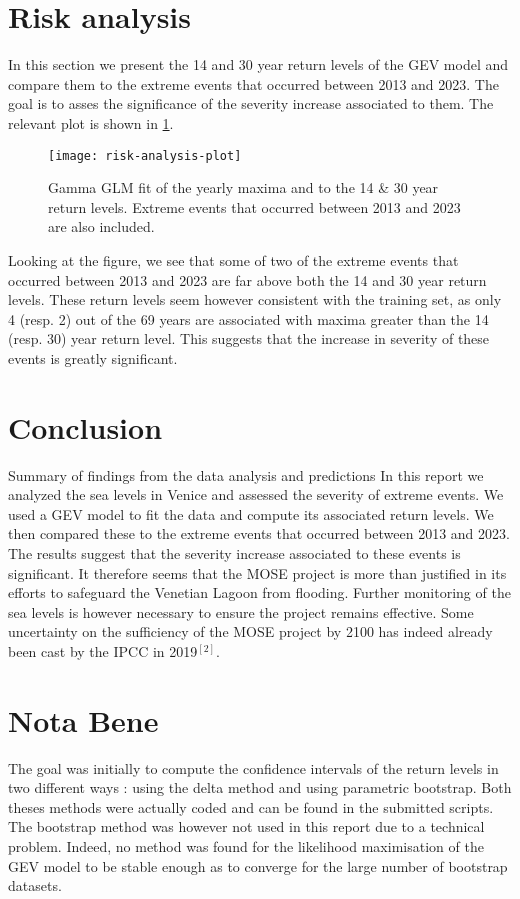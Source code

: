 \documentclass[a4paper, 12pt,oneside]{article}
\begin{document}
    \section{Risk analysis}
    In this section we present the 14 and 30 year return levels of the GEV model and compare them to the extreme events that occurred between 2013 and 2023. The goal is to asses the significance of the severity increase associated to them. The relevant plot is shown in \ref{fig:risk-analysis-plot}.
    \begin{figure}[h!]
        \centering
        \vspace{0em}
        \texttt{[image: risk-analysis-plot]}
        \caption{Gamma GLM fit of the yearly maxima and to the 14 \& 30 year return levels. Extreme events that occurred between 2013 and 2023 are also included.}
        \label{fig:risk-analysis-plot}
    \end{figure}
    Looking at the figure, we see that some of two of the extreme events that occurred between 2013 and 2023 are far above both the 14 and 30 year return levels. These return levels seem however consistent with the training set, as only 4 (resp. 2) out of the 69 years are associated with maxima greater than the 14 (resp. 30) year return level. This suggests that the increase in severity of these events is greatly significant. 
    \section{Conclusion}
    Summary of findings from the data analysis and predictions
    In this report we analyzed the sea levels in Venice and assessed the severity of extreme events. We used a GEV model to fit the data and compute its associated return levels. We then compared these to the extreme events that occurred between 2013 and 2023. The results suggest that the severity increase associated to these events is significant.
    It therefore seems that the MOSE project is more than justified in its efforts to safeguard the Venetian Lagoon from flooding. Further monitoring of the sea levels is however necessary to ensure the project remains effective. Some uncertainty on the sufficiency of the MOSE project by 2100 has indeed already been cast by the IPCC in 2019$^{[2]}$.
    \section{Nota Bene}
    The goal was initially to compute the confidence intervals of the return levels in two different ways : using the delta method and using parametric bootstrap. Both theses methods were actually coded and can be found in the submitted scripts. The bootstrap method was however not used in this report due to a technical problem. Indeed, no method was found for the likelihood maximisation of the GEV model to be stable enough as to converge for the large number of bootstrap datasets. 
\end{document}
